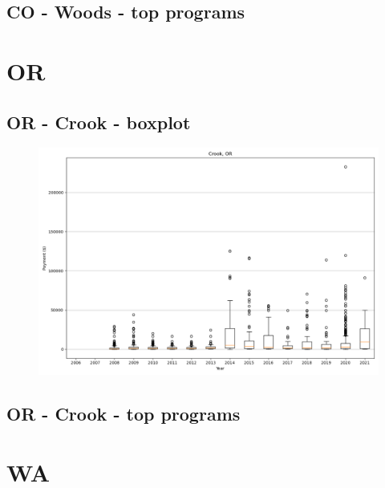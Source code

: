 \subsection*{CO - Woods - top programs}

\newpage
\section*{OR}
\subsection*{OR - Crook - boxplot}
\begin{figure}[h]
\centering
\includegraphics[width=7in]{../output/boxplots/counties/Crook-OR_boxplot.png}
\end{figure}


\subsection*{OR - Crook - top programs}

\newpage
\section*{WA}
